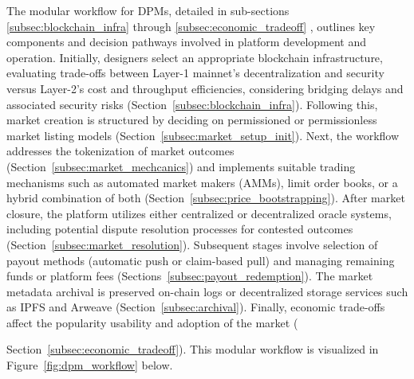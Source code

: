 The modular workflow for DPMs, detailed in sub-sections \ref{subsec:blockchain_infra} through \ref{subsec:economic_tradeoff} , outlines key components and decision pathways involved in platform development and operation. Initially, designers select an appropriate blockchain infrastructure, evaluating trade-offs between Layer-1 mainnet's decentralization and security versus Layer-2's cost and throughput efficiencies, considering bridging delays and associated security risks (Section~\ref{subsec:blockchain_infra}). Following this, market creation is structured by deciding on permissioned or permissionless market listing models (Section~\ref{subsec:market_setup_init}). Next, the workflow addresses the tokenization of market outcomes (Section~\ref{subsec:market_mechcanics}) and implements suitable trading mechanisms such as automated market makers (AMMs), limit order books, or a hybrid combination of both (Section~\ref{subsec:price_bootstrapping}). After market closure, the platform utilizes either centralized or decentralized oracle systems, including potential dispute resolution processes for contested outcomes (Section~\ref{subsec:market_resolution}). Subsequent stages involve selection of payout methods (automatic push or claim-based pull) and managing remaining funds or platform fees (Sections~\ref{subsec:payout_redemption}). The market metadata archival is preserved on-chain logs or decentralized storage services such as IPFS and Arweave (Section~\ref{subsec:archival}). Finally, economic trade-offs affect the popularity usability and adoption of the market ({Section~\ref{subsec:economic_tradeoff}). This modular workflow is visualized in Figure~\ref{fig:dpm_workflow} below.

}
